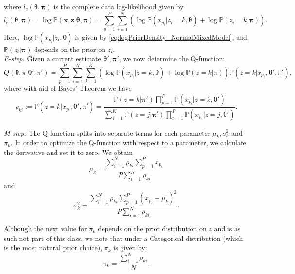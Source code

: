 \documentclass[a4paper,11pt]{article}
\def\x{\boldsymbol{x}}
\def\z{\boldsymbol{z}}
\def\bpi{\boldsymbol{\pi}}
\def\btheta{\boldsymbol{\theta}}
\def\p{\mathbb{P}}
\begin{document}
where $l_c(\btheta, \bpi)$ is the complete data log-likelihood given by
\begin{equation*}
 l_c(\btheta, \bpi) = \log \p(\x, \z | \btheta, \bpi) = \sum_{p=1}^P \sum_{i=1}^N \left( \log \p(x_{p_i} | z_i = k, \btheta) + \log \p(z_i = k | \bpi) \right).
\end{equation*}
Here, $\log \p(x_{p_i} | z_i, \btheta)$ is given by \eqref{eq:logPriorDensity_NormalMixedModel}, and $\p(z_i | \bpi)$ depends on the prior on $z_i$.\\
{\it E-step.} Given a current estimate $\btheta', \bpi'$, we now determine the Q-function:
\begin{equation*}
Q(\btheta, \pi  | \btheta', \pi') = \sum_{p=1}^P \sum_{i=1}^N \sum_{k=1}^K \left(\log \p(x_{p_i} | z = k, \btheta) + \log \p(z = k | \pi)\right) \p(z = k | x_{p_i}, \btheta', \pi'),
\end{equation*}
where with aid of Bayes' Theorem we have
\begin{equation}\label{eq:weights}
\rho_{ki}:=\p(z = k | x_{p_i}, \btheta', \pi') = \frac{\p(z = k | \bpi') \prod_{p=1}^P \p(x_{p_i} | z = k,  \btheta') }{\sum_{j=1}^K\p(z = j | \bpi') \prod_{p=1}^P \p(x_{p_i} | z = j,  \btheta') }.
\end{equation}

{\it M-step.} The Q-function splits into separate terms for each parameter $\mu_k, \sigma_k^2$ and $\pi_k$. In order to optimize the Q-function with respect to a parameter, we calculate the derivative and set it to zero. We obtain
\begin{equation*}
\mu_k = \frac{\sum_{i=1}^N \rho_{ki} \sum_{p=1}^P x_{p_i} }{P\sum_{i=1}^N \rho_{ki}}
\end{equation*}
and
\begin{equation*}
\sigma_k^2 = \frac{\sum_{i=1}^N \rho_{ki} \sum_{p=1}^P  \left(x_{p_i}-\mu_k\right)^2}{P\sum_{i=1}^N \rho_{ki}}.
\end{equation*}

Although the next value for $\pi_k$ depends on the prior distribution on $z$ and is as such not part of this class, we note that under a Categorical distribution (which is the most natural prior choice), $\pi_k$ is given by:
\begin{equation*}
\pi_k = \frac{\sum_{i=1}^N \rho_{ki}}{N}.
\end{equation*}
\end{document}
